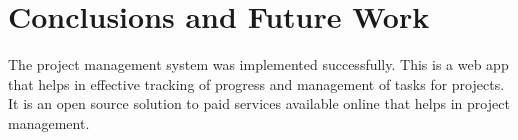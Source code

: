 \chapter{Conclusions and Future Work}
The project management system was implemented successfully. This is a web app that helps in effective tracking of progress and management of tasks for projects. It is an open source solution to paid services available online that helps in project management. 
